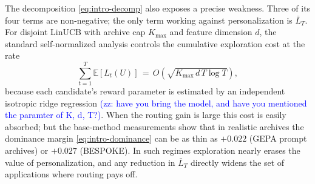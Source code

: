 \documentclass{article} %
\providecommand{\E}{\mathbb{E}}
\providecommand{\zz}[1]{\textcolor{blue}{(zz: #1)}}
\begin{document}
The decomposition \eqref{eq:intro-decomp} also exposes a precise weakness. Three of its four terms are non-negative; the only term working against personalization is $\bar L_T$. For disjoint LinUCB with archive cap $K_{\max}$ and feature dimension $d$, the standard self-normalized analysis \citep{abbasi2011oful,chu2011linucb} controls the cumulative exploration cost at the rate
\begin{equation}
\label{eq:intro-linucb-cost}
\sum_{t=1}^{T}\E[L_t(U)]
\,=\,
O\!\left(\sqrt{K_{\max}\, d\, T \log T}\right),
\end{equation}
because each candidate's reward parameter is estimated by an independent isotropic ridge regression \zz{have you bring the model, and have you mentioned the paramter of K, d, T?}. When the routing gain is large this cost is easily absorbed; but the base-method measurements show that in realistic archives the dominance margin \eqref{eq:intro-dominance} can be as thin as $+0.022$ (GEPA prompt archives) or $+0.027$ (BESPOKE). In such regimes exploration nearly erases the value of personalization, and any reduction in $\bar L_T$ directly widens the set of applications where routing pays off.
\end{document}
